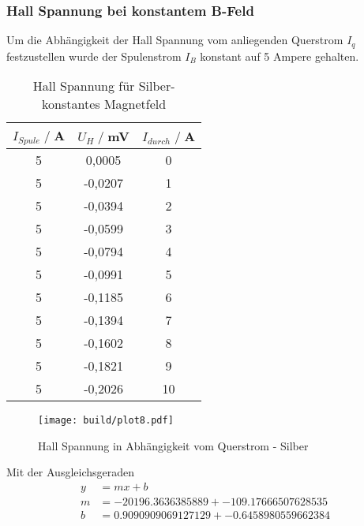 \subsubsection{Hall Spannung bei konstantem B-Feld}
Um die Abhängigkeit der Hall Spannung vom anliegenden Querstrom $I_q$ festzustellen wurde der Spulenstrom $I_B$ konstant auf 5 Ampere gehalten.
\begin{table}[H]
    \centering
    \begin{tabular}{c c c}
        \toprule
        $I_{Spule} \;/\;$A & $U_H\;/\;$mV & $I_{durch} \;/\;$A\\
        \midrule
  5                   &0,0005&              0\\
  5                   &-0,0207&             1\\
  5                   &-0,0394&             2\\
  5                   &-0,0599&             3\\
  5                   &-0,0794&             4\\
  5                   &-0,0991&             5\\
  5                   &-0,1185&             6\\
  5                   &-0,1394&             7\\
  5                   &-0,1602&             8\\
  5                   &-0,1821&             9\\
  5                   &-0,2026&             10\\

       \bottomrule
    \end{tabular}
    \caption{Hall Spannung für Silber- konstantes Magnetfeld}
    \label{tab:Ag_I}
\end{table}
\begin{figure}[H]
    \centering
    \texttt{[image: build/plot8.pdf]}
    \caption{Hall Spannung in Abhängigkeit vom Querstrom - Silber}
    \label{fig:Ag_I}
\end{figure}
Mit der Ausgleichsgeraden
\begin{align*}
    y &= mx + b\\
    m &= -20196.3636385889 +- 109.17666507628535\\
    b &= 0.9090909069127129 +- 0.6458980559662384\\
\end{align*}

